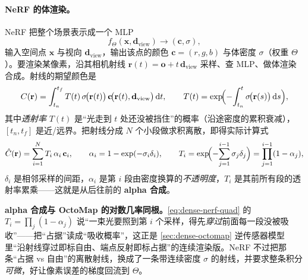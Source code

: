 \paragraph{NeRF 的体渲染。}
NeRF 把整个场景表示成一个 MLP
\begin{equation}
  f_{\Theta}(\mathbf{x},\mathbf{d}_{\mathrm{view}})\to(\mathbf{c},\sigma),
  \label{eq:dense-nerf-mlp}
\end{equation}
输入空间点 $\mathbf{x}$ 与视向 $\mathbf{d}_{\mathrm{view}}$，输出该点的颜色 $\mathbf{c}=(r,g,b)$ 与体密度 $\sigma$（权重 $\Theta$）。要渲染某像素，沿其相机射线 $\mathbf{r}(t)=\mathbf{o}+t\,\mathbf{d}_{\mathrm{view}}$ 采样、查 MLP、做体渲染合成。射线的期望颜色是
\begin{equation}
  C(\mathbf{r})=\int_{t_n}^{t_f}T(t)\,\sigma\!\bigl(\mathbf{r}(t)\bigr)\,\mathbf{c}\!\bigl(\mathbf{r}(t),\mathbf{d}_{\mathrm{view}}\bigr)\,\mathrm{d}t,
  \qquad
  T(t)=\exp\!\Bigl(-\!\int_{t_n}^{t}\sigma\!\bigl(\mathbf{r}(s)\bigr)\,\mathrm{d}s\Bigr),
  \label{eq:dense-nerf-integral}
\end{equation}
其中\emph{透射率} $T(t)$ 是“光走到 $t$ 处还没被挡住”的概率（沿途密度的累积衰减），$[t_n,t_f]$ 是近/远界。把射线分成 $N$ 个小段做求积离散，即得实际计算式
\begin{equation}
  \hat{C}(\mathbf{r})=\sum_{i=1}^{N}T_i\,\alpha_i\,\mathbf{c}_i,
  \qquad
  \alpha_i=1-\exp(-\sigma_i\delta_i),
  \qquad
  T_i=\exp\!\Bigl(-\!\sum_{j=1}^{i-1}\sigma_j\delta_j\Bigr)=\prod_{j=1}^{i-1}(1-\alpha_j),
  \label{eq:dense-nerf-quad}
\end{equation}
$\delta_i$ 是相邻采样的间距，$\alpha_i$ 是第 $i$ 段由密度换算的\emph{不透明度}，$T_i$ 是其前所有段的透射率累乘——这就是从后往前的 \textbf{alpha 合成}。

\begin{insight}
\textbf{alpha 合成与 OctoMap 的对数几率同根。}\cref{eq:dense-nerf-quad} 的 $T_i=\prod_j(1-\alpha_j)$ 说“一束光要照到第 $i$ 个采样，得先\emph{穿过}前面每一段没被吸收”——把“占据”读成“吸收概率”，这正是 \cref{sec:dense-octomap} 逆传感器模型里“沿射线穿过即标自由、端点反射即标占据”的连续渲染版。NeRF 不过把那条“占据 vs 自由”的离散射线，换成了一条带连续密度 $\sigma$ 的射线，并要求整条积分\emph{可微}，好让像素误差的梯度回流到 $\Theta$。
\end{insight}

